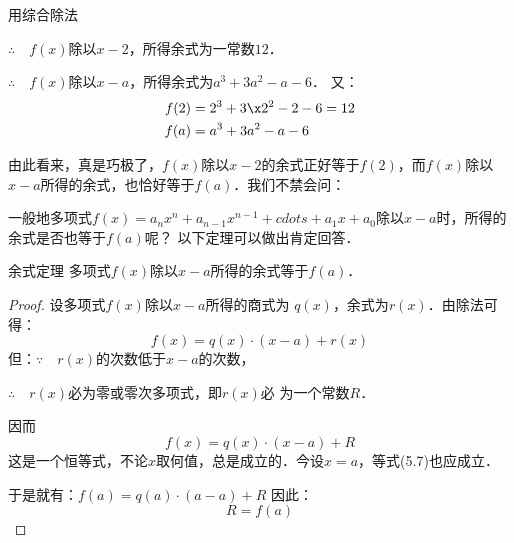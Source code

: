 \begin{solution}
用综合除法   
\begin{center}
\end{center}
$\therefore\quad f(x)$除以$x-2$，所得余式为一常数$12$．

\begin{center}
    \end{center}
$\therefore\quad f(x)$除以$x-a$，所得余式为$a^3+3a^2-a-6$．
又：
\[\begin{split}
f(2)&= 2^3+3\x 2^2-2-6=12 \\
f(a)&= a^3+3a^2-a-6   
\end{split}\]
\end{solution}


由此看来，真是巧极了，$f(x)$除以$x-2$的余式正好等于$f(2)$，而$f(x)$除以$x-a$所得的余式，也恰好等于$f(a)$．我们不禁会问：

一般地多项式$f(x)=a_n x^n +a_{n-1}x^{n-1}+cdots+a_1x+a_0$除以$x-a$时，所得的余式是否也等于$f(a)$呢？
以下定理可以做出肯定回答．

\begin{blk}{余式定理}
多项式$f(x)$除以$x-a$所得的余式等于$f(a)$．    
\end{blk}

\begin{proof}
    设多项式$f(x)$除以$x-a$所得的商式为
$q(x)$，余式为$r(x)$．由除法可得：
\[f (x) =q (x)\cdot  (x-a)+r(x)\]
但：$\because\quad r(x)$的次数低于$x-a$的次数，

$\therefore\quad r(x)$必为零或零次多项式，即$r(x)$必
    为一个常数$R$．

因而
\begin{equation}
    f (x) =q (x) \cdot  (x-a) +R
\end{equation}
这是一个恒等式，不论$x$取何值，总是成立的．今设$x=a$，等式(5.7)也应成立．

    于是就有：$f(a)=q(a)\cdot (a-a)+R$
因此： 
\begin{equation}
   R=f (a)  
\end{equation}
\end{proof}

